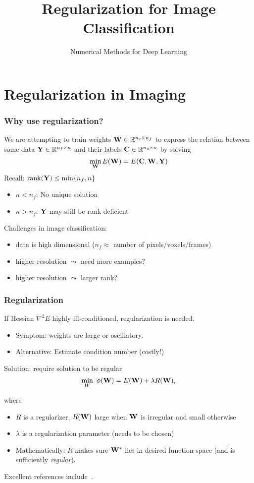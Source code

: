 \documentclass[12pt,fleqn,handout]{beamer}
\title[Reg Image Class]{Regularization for Image Classification}
\subtitle{Numerical Methods for Deep Learning}
\date{}
\begin{document}
\makebeamertitle


\section{Regularization in Imaging} %
\label{sec:regularization_in_imaging}

\begin{frame}[fragile]\frametitle{Why use regularization?}
We are attempting to train weights ${\bf W} \in \mathbb{R}^{n_c \times n_f}$ to express the relation between some data ${\bf Y} \in \mathbb{R}^{n_f \times n}$ and their labels ${\bf C} \in \mathbb{R}^{n_c \times n}$ by solving
$$
	 \min_{\bf W}  E({\bf W}) =  E({\bf C},{\bf W},{\bf Y})
$$ 
Recall: ${\rm rank}({\bf Y}) \leq \min\{n_f,n\}$
\begin{itemize}
\item $n < n_f$: No unique solution
\item $n > n_f$: ${\bf Y}$ may still be rank-deficient
\end{itemize}

\pause

Challenges in image classification: 
\begin{itemize}
	\item data is high dimensional ($n_f \approx$ number of pixels/voxels/frames)
	\item higher resolution $\leadsto$ need more examples? 
	\item higher resolution $\leadsto$ larger rank?
\end{itemize}

\end{frame}


\begin{frame}[fragile]\frametitle{Regularization}
If Hessian $\nabla^2 E$ highly ill-conditioned, regularization is needed.
\begin{itemize}
\item Symptom: weights are large or oscillatory.
\item Alternative: Estimate condition number (costly!)
\end{itemize}

\pause

Solution: require solution to be regular
$$ \min_W\ \phi({\bf W}) = E({\bf W}) + \lambda R({\bf W}), $$

where
\begin{itemize}
	\item $R$ is a regularizer, $R({\bf W})$ large when ${\bf W}$ is irregular and small otherwise
	\item $\lambda$ is a regularization parameter (needs to be chosen)
	\item Mathematically: $R$ makes sure ${\bf W}^*$ lies in desired function space (and is sufficiently \emph{regular}).
\end{itemize}

Excellent references include~\cite{Hansen1998,Hansen2010, Vogel2002}.
\end{frame}
\end{document}
